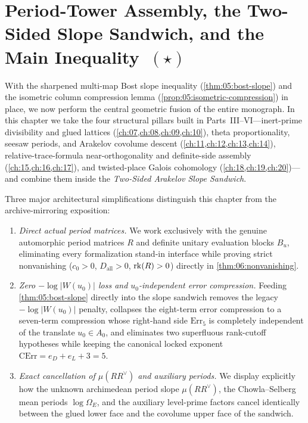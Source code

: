 \chapter{Period-Tower Assembly, the Two-Sided Slope Sandwich, and the Main Inequality~$(\star)$}
\label{ch:06}

With the sharpened multi-map Bost slope inequality (\cref{thm:05:bost-slope}) and the isometric column compression lemma (\cref{prop:05:isometric-compression}) in place, we now perform the central geometric fusion of the entire monograph. In this chapter we take the four structural pillars built in Parts~III--VI—inert-prime divisibility and glued lattices (\cref{ch:07,ch:08,ch:09,ch:10}), theta proportionality, seesaw periods, and Arakelov covolume descent (\cref{ch:11,ch:12,ch:13,ch:14}), relative-trace-formula near-orthogonality and definite-side assembly (\cref{ch:15,ch:16,ch:17}), and twisted-place Galois cohomology (\cref{ch:18,ch:19,ch:20})—and combine them inside the \emph{Two-Sided Arakelov Slope Sandwich}.

Three major architectural simplifications distinguish this chapter from the archive-mirroring exposition:
\begin{enumerate}[label=(\roman*)]
\item \emph{Direct actual period matrices.} We work exclusively with the genuine automorphic period matrices $R$ and definite unitary evaluation blocks $B_u$, eliminating every formalization stand-in interface while proving strict nonvanishing ($c_0 > 0$, $D_{\mathrm{all}} > 0$, $\operatorname{rk}(R) > 0$) directly in \cref{thm:06:nonvanishing}.
\item \emph{Zero $-\log|W(u_0)|$ loss and $u_0$-independent error compression.} Feeding \cref{thm:05:bost-slope} directly into the slope sandwich removes the legacy $-\log|W(u_0)|$ penalty, collapses the eight-term error compression to a seven-term compression whose right-hand side $\mathrm{Err}_5$ is completely independent of the translate $u_0 \in A_0$, and eliminates two superfluous rank-cutoff hypotheses while keeping the canonical locked exponent $\mathrm{CErr} = e_D + e_L + 3 = 5$.
\item \emph{Exact cancellation of $\mu(R R^\vee)$ and auxiliary periods.} We display explicitly how the unknown archimedean period slope $\mu(R R^\vee)$, the Chowla--Selberg mean periods $\log\Omega_E$, and the auxiliary level-prime factors cancel identically between the glued lower face and the covolume upper face of the sandwich.
\end{enumerate}

